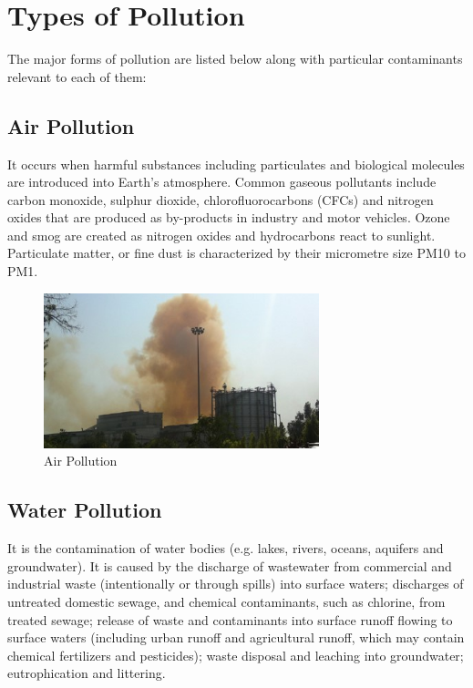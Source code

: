 \section{Types of Pollution}
The major forms of pollution are listed below along with particular contaminants relevant to each of them:

\subsection{Air Pollution}
It occurs when harmful substances including particulates and biological molecules are introduced into Earth's atmosphere. Common gaseous pollutants include carbon monoxide, sulphur dioxide, chlorofluorocarbons (CFCs) and nitrogen oxides that are produced as by-products in industry and motor vehicles. Ozone and smog are created as nitrogen oxides and hydrocarbons react to sunlight. Particulate matter, or fine dust is characterized by their micrometre size PM10 to PM1.
\begin{figure}[h]
\begin{center}
 \includegraphics[width=80mm]{air.jpg}
 \caption{Air Pollution}
   \label{fig:Air Pollution}
\end{center}
\end{figure}

\subsection{Water Pollution}
It is the contamination of water bodies (e.g. lakes, rivers, oceans, aquifers and groundwater). It is caused by the discharge of wastewater from commercial and industrial waste (intentionally or through spills) into surface waters; discharges of untreated domestic sewage, and chemical contaminants, such as chlorine, from treated sewage; release of waste and contaminants into surface runoff flowing to surface waters (including urban runoff and agricultural runoff, which may contain chemical fertilizers and pesticides); waste disposal and leaching into groundwater; eutrophication and littering.

